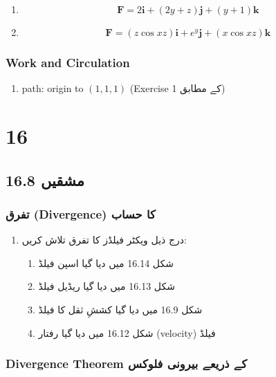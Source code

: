 \begin{enumerate}
\begin{enumerate}
\item[33.]
\[
\mathbf{F} = 2\mathbf{i} + (2y+z)\mathbf{j} + (y+1)\mathbf{k}
\]

\item[34.]
\[
\mathbf{F} = (z\cos xz)\mathbf{i} + e^y\mathbf{j} + (x\cos xz)\mathbf{k}
\]
\end{enumerate}

\bigskip

\subsection*{Work and Circulation}

\begin{enumerate}
\item[35--36.]
path: origin to \( (1,1,1) \) (Exercise 1 کے مطابق)
\end{enumerate}


\chapter{16}

\section*{مشقیں 16.8}

\subsection*{تفرق (Divergence) کا حساب}

\begin{enumerate}
\item درج ذیل ویکٹر فیلڈز کا تفرق تلاش کریں:
\begin{enumerate}
\item شکل 16.14 میں دیا گیا اسپن فیلڈ
\item شکل 16.13 میں دیا گیا ریڈیل فیلڈ
\item شکل 16.9 میں دیا گیا کششِ ثقل کا فیلڈ
\item شکل 16.12 میں دیا گیا رفتار (velocity) فیلڈ
\end{enumerate}
\end{enumerate}

\subsection*{Divergence Theorem کے ذریعے بیرونی فلوکس}


\end{enumerate}
